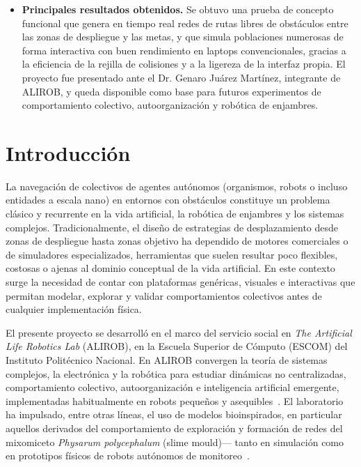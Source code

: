 \documentclass[12pt,a4paper]{article}
\begin{document}
\begin{itemize}
\item \textbf{Principales resultados obtenidos.} Se obtuvo una prueba de concepto funcional que genera en tiempo real redes de rutas libres de obstáculos entre las zonas de despliegue y las metas, y que simula poblaciones numerosas de forma interactiva con buen rendimiento en laptops convencionales, gracias a la eficiencia de la rejilla de colisiones y a la ligereza de la interfaz propia. El proyecto fue presentado ante el Dr. Genaro Juárez Martínez, integrante de ALIROB, y queda disponible como base para futuros experimentos de comportamiento colectivo, autoorganización y robótica de enjambres.
\end{itemize}


\section{Introducción}

La navegación de colectivos de agentes autónomos (organismos, robots o incluso entidades a escala nano) en entornos con obstáculos constituye un problema clásico y recurrente en la vida artificial, la robótica de enjambres y los sistemas complejos. Tradicionalmente, el diseño de estrategias de desplazamiento desde zonas de despliegue hasta zonas objetivo ha dependido de motores comerciales o de simuladores especializados, herramientas que suelen resultar poco flexibles, costosas o ajenas al dominio conceptual de la vida artificial. En este contexto surge la necesidad de contar con plataformas genéricas, visuales e interactivas que permitan modelar, explorar y validar comportamientos colectivos antes de cualquier implementación física.

El presente proyecto se desarrolló en el marco del servicio social en \emph{The Artificial Life Robotics Lab} (ALIROB), en la Escuela Superior de Cómputo (ESCOM) del Instituto Politécnico Nacional. En ALIROB convergen la teoría de sistemas complejos, la electrónica y la robótica para estudiar dinámicas no centralizadas, comportamiento colectivo, autoorganización e inteligencia artificial emergente, implementadas habitualmente en robots pequeños y asequibles~\cite{gacetaIPN2024,alirob}. El laboratorio ha impulsado, entre otras líneas, el uso de modelos bioinspirados, en particular aquellos derivados del comportamiento de exploración y formación de redes del mixomiceto \emph{Physarum polycephalum} (slime mould)— tanto en simulación como en prototipos físicos de robots autónomos de monitoreo~\cite{hernandez2024tesis,adamatzky2012maze}.
\end{document}
